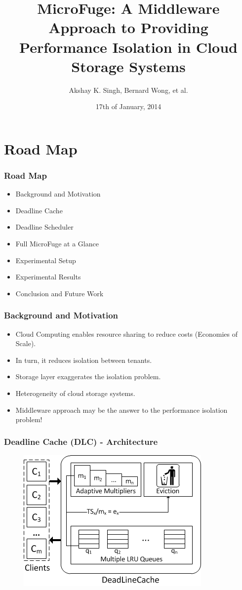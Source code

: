 \documentclass{beamer}
\begin{document}
\date{17th of January, 2014}
\title{MicroFuge: A Middleware Approach to Providing Performance Isolation in Cloud Storage Systems}
\author{Akshay K. Singh, Bernard Wong, et al.}

\frame{\titlepage}

\section*{Road Map}
\begin{frame}
\frametitle{Road Map}
  \begin{itemize}
    \item Background and Motivation
    \item Deadline Cache
    \item Deadline Scheduler
    \item Full MicroFuge at a Glance
    \item Experimental Setup
    \item Experimental Results
    \item Conclusion and Future Work
  \end{itemize}
\end{frame}

\begin{frame}
\frametitle{Background and Motivation}
  \begin{itemize}
    \item Cloud Computing enables resource sharing to reduce costs (Economies of Scale).
    \item In turn, it reduces isolation between tenants.
    \item Storage layer exaggerates the isolation problem.
    \item Heterogeneity of cloud storage systems.
    \item Middleware approach may be the answer to the performance isolation problem!
  \end{itemize}
\end{frame}


\begin{frame}
  \frametitle{Deadline Cache (DLC) - Architecture}
  \begin{figure}
    \begin{center}
      \centerline{\includegraphics[scale=0.8]{img/DLC_arch.png}}
    \end{center}
  \end{figure}
\end{frame}
\end{document}
